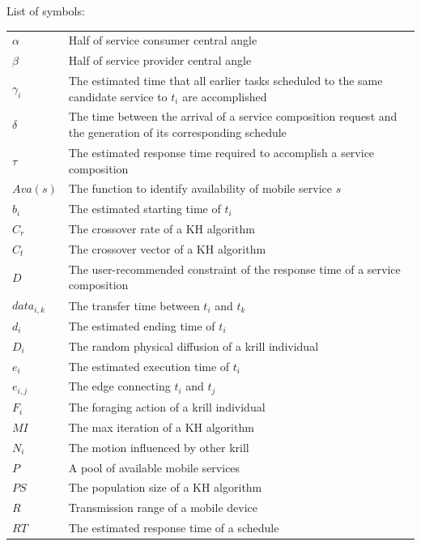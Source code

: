 \documentclass[journal]{IEEEtran}
\begin{document}
\noindent List of symbols: 
~\\

\noindent
\begin{tabular}{@{} l p{7.36cm} }
$\alpha$      &   Half of service consumer central angle \\
$\beta$       &   Half of service provider central angle \\
$\gamma_{i}$  &   The estimated time that all earlier tasks scheduled to the same candidate service to $t_i$ are accomplished  \\
$\delta$      &   The time between the arrival of a service composition request and the generation of its corresponding schedule \\
$\tau$        &   The estimated response time required to accomplish a service composition \\
$Ava(s)$      &   The function to identify availability of mobile service $s$ \\
$b_i$         &   The estimated starting time of $t_i$ \\
$C_{r}$       &   The crossover rate of a KH algorithm \\
$C_{t}$       &   The crossover vector of a KH algorithm \\
$D$           &   The user-recommended constraint of the response time of a service composition \\
$data_{i,k}$  &   The transfer time between $t_i$ and $t_k$ \\
$d_i$         &   The estimated ending time of $t_i$ \\
$D_i$         &   The random physical diffusion of a krill individual \\
$e_i$         &   The estimated execution time of $t_i$ \\
$e_{i,j}$     &   The edge connecting $t_i$ and $t_j$ \\
$F_i$         &   The foraging action of a krill individual \\ 
$MI$          &   The max iteration of a KH algorithm \\
$N_i$         &   The motion influenced by other krill \\
$P$           &   A pool of available mobile services \\
$PS$          &   The population size of a KH algorithm \\
$R$           &   Transmission range of a mobile device \\
$RT$          &   The estimated response time of a schedule \\

\end{tabular}
\end{document}
